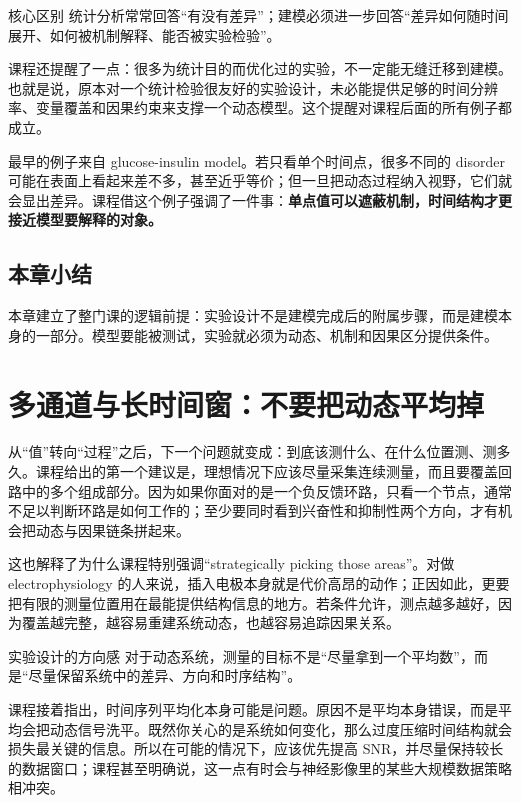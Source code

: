 \documentclass[a4paper]{article}
\begin{document}
\begin{knowledgebox}{核心区别}
统计分析常常回答“有没有差异”；建模必须进一步回答“差异如何随时间展开、如何被机制解释、能否被实验检验”。
\end{knowledgebox}

课程还提醒了一点：很多为统计目的而优化过的实验，不一定能无缝迁移到建模。也就是说，原本对一个统计检验很友好的实验设计，未必能提供足够的时间分辨率、变量覆盖和因果约束来支撑一个动态模型。这个提醒对课程后面的所有例子都成立。

最早的例子来自 glucose-insulin model。若只看单个时间点，很多不同的 disorder 可能在表面上看起来差不多，甚至近乎等价；但一旦把动态过程纳入视野，它们就会显出差异。课程借这个例子强调了一件事：\textbf{单点值可以遮蔽机制，时间结构才更接近模型要解释的对象。}

\subsection{本章小结}
本章建立了整门课的逻辑前提：实验设计不是建模完成后的附属步骤，而是建模本身的一部分。模型要能被测试，实验就必须为动态、机制和因果区分提供条件。

\section{多通道与长时间窗：不要把动态平均掉}
从“值”转向“过程”之后，下一个问题就变成：到底该测什么、在什么位置测、测多久。课程给出的第一个建议是，理想情况下应该尽量采集连续测量，而且要覆盖回路中的多个组成部分。因为如果你面对的是一个负反馈环路，只看一个节点，通常不足以判断环路是如何工作的；至少要同时看到兴奋性和抑制性两个方向，才有机会把动态与因果链条拼起来。

这也解释了为什么课程特别强调“strategically picking those areas”。对做 electrophysiology 的人来说，插入电极本身就是代价高昂的动作；正因如此，更要把有限的测量位置用在最能提供结构信息的地方。若条件允许，测点越多越好，因为覆盖越完整，越容易重建系统动态，也越容易追踪因果关系。

\begin{importantbox}{实验设计的方向感}
对于动态系统，测量的目标不是“尽量拿到一个平均数”，而是“尽量保留系统中的差异、方向和时序结构”。
\end{importantbox}

课程接着指出，时间序列平均化本身可能是问题。原因不是平均本身错误，而是平均会把动态信号洗平。既然你关心的是系统如何变化，那么过度压缩时间结构就会损失最关键的信息。所以在可能的情况下，应该优先提高 SNR，并尽量保持较长的数据窗口；课程甚至明确说，这一点有时会与神经影像里的某些大规模数据策略相冲突。
\end{document}

